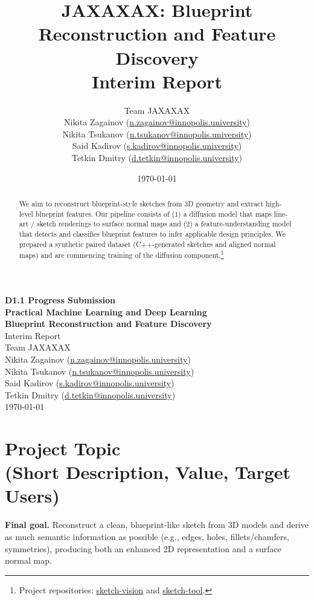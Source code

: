 \documentclass[11pt,a4paper]{article}
\title{\textbf{JAXAXAX}: Blueprint Reconstruction and Feature Discovery\\\large Interim Report}
\author{Team JAXAXAX \\[4pt]
  Nikita Zagainov (\href{mailto:n.zagainov@innopolis.university}{n.zagainov@innopolis.university}) \\
  Nikita Tsukanov (\href{mailto:n.tsukanov@innopolis.university}{n.tsukanov@innopolis.university}) \\
  Said Kadirov (\href{mailto:s.kadirov@innopolis.university}{s.kadirov@innopolis.university}) \\
  Tetkin Dmitry (\href{mailto:d.tetkin@innopolis.university}{d.tetkin@innopolis.university})
}
\date{\today}
\begin{document}
\begin{center}
{\Large \textbf{D1.1 Progress Submission}} \\[12pt]
{\Large \textbf{Practical Machine Learning and Deep Learning}} \\[24pt]
{\Large \textbf{Blueprint Reconstruction and Feature Discovery}} \\[8pt]
{\large Interim Report} \\[24pt]

Team JAXAXAX \\[8pt]
Nikita Zagainov (\href{mailto:n.zagainov@innopolis.university}{n.zagainov@innopolis.university}) \\
Nikita Tsukanov (\href{mailto:n.tsukanov@innopolis.university}{n.tsukanov@innopolis.university}) \\
Said Kadirov (\href{mailto:s.kadirov@innopolis.university}{s.kadirov@innopolis.university}) \\
Tetkin Dmitry (\href{mailto:d.tetkin@innopolis.university}{d.tetkin@innopolis.university}) \\[12pt]

\today
\end{center}

\begin{abstract}
We aim to reconstruct blueprint-style sketches from 3D geometry and extract high-level blueprint features. Our pipeline consists of (1) a diffusion model that maps line-art / sketch renderings to surface normal maps and (2) a feature-understanding model that detects and classifies blueprint features to infer applicable design principles. We prepared a synthetic paired dataset (C++-generated sketches and aligned normal maps) and are commencing training of the diffusion component.\footnote{Project repositories: \href{https://github.com/touch-topnotch/sketch-vision}{sketch-vision} and \href{https://github.com/touch-topnotch/sketch-tool}{sketch-tool}.}
\end{abstract}

\section{Project Topic \\ \small (Short Description, Value, Target Users)}
\textbf{Final goal.} Reconstruct a clean, blueprint-like sketch from 3D models and derive as much semantic information as possible (e.g., edges, holes, fillets/chamfers, symmetries), producing both an enhanced 2D representation and a surface normal map.
\end{document}
